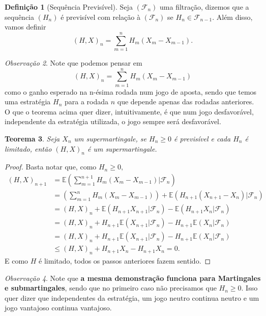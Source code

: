 \documentclass[12pt,a4paper,oneside]{book}
\newtheorem{theorem}{Teorema}[section]
\theoremstyle{definition}
\newtheorem{definition}[theorem]{Defini\c{c}\~ao}
\theoremstyle{remark}
\newtheorem{remark}[theorem]{Observa\c{c}\~ao}
\numberwithin{equation}{section}
\newcommand{\E}{\mathbb{E}}
\newcommand{\F}{\mathcal{F}}
\begin{document}
\begin{definition}[Sequência Previsível] Seja $(\F_n)$ uma filtração, dizemos que a sequência $(H_n)$ é previsível com relação à $(\F_n)$ se $H_n \in \F_{n-1}$. 
Além disso, vamos definir
$$(H,X)_n  =\sum^n_{m=1}H_m(X_m - X_{m-1}).  $$
\end{definition}

\begin{tcolorbox}[colback = yellow!60]
\begin{remark}
Note que podemos pensar em
$$ (H,X)_n = \sum^n_{m=1}H_m(X_m - X_{m-1})$$
como o ganho esperado na n-ésima rodada num jogo de aposta, sendo que temos uma estratégia $H_n$ para a rodada $n$ que depende apenas das rodadas anteriores. O que o teorema acima quer dizer, intuitivamente, é que num jogo desfavorável, independente da estratégia utilizada, o jogo sempre será desfavorável.
\end{remark}
\end{tcolorbox}

\begin{theorem}\label{teo- superm+previ+limit=HXsuper}
Seja $X_n$ um supermartingale, se $H_n\geq 0$ é previsível e cada $H_n$ é limitado, então $(H,X)_n$ é um supermartingale.
\end{theorem}
\begin{proof}
Basta notar que, como $H_n\geq 0,$
\begin{align*}
(H,X)_{n+1} & =\E\left(\sum_{m=1}^{n+1} H_m(X_m-X_{m-1})\left|\F_n\right. \right)\\
&=\left(\sum_{m=1}^{n} H_m(X_m-X_{m-1})\right) + \E(H_{n+1}(X_{n+1}-X_n)|\F_n)\\
& = (H,X)_n + \E(H_{n+1}X_{n+1}|\F_n) - \E(H_{n+1}X_n|\F_n)\\
& =(H,X)_n + H_{n+1}\E(X_{n+1}|\F_n) - H_{n+1}\E(X_n|\F_n)\\
& =(H,X)_n + H_{n+1}\E(X_{n+1}|\F_n) - H_{n+1}\E(X_n|\F_n)\\
&\leq (H,X)_n + H_{n+1}X_{n} - H_{n+1}X_n = 0. 
\end{align*}
E como $H$ é limitado, todos os passos anteriores fazem sentido.

\end{proof}

\begin{tcolorbox}[colback = yellow!60]
\begin{remark}
Note que \textbf{a mesma demonstração funciona para Martingales e submartingales}, sendo que no primeiro caso não precisamos que $H_n\geq 0$. Isso quer dizer que independentes da estratégia, um jogo neutro continua neutro e um jogo vantajoso continua vantajoso.
\end{remark}
\end{tcolorbox}
\end{document}
